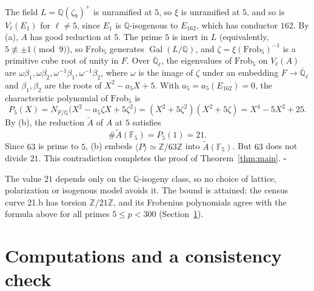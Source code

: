 \documentclass[11pt]{article}
\newcommand{\Q}{\mathbb Q}
\newcommand{\Z}{\mathbb Z}
\newcommand{\F}{\mathbb F}
\DeclareMathOperator{\Gal}{Gal}
\begin{document}
The field \(L=\Q(\zeta_9)^+\) is unramified at \(5\), so \(\xi\) is
unramified at \(5\), and so is \(V_\ell(E_1)\) for \(\ell\neq5\), since
\(E_1\) is \(\Q\)-isogenous to \(E_{162}\), which has conductor \(162\).
By (a), \(A\) has good reduction at \(5\). The prime \(5\) is inert in
\(L\) (equivalently, \(5\not\equiv\pm1\pmod9\)), so
\(\mathrm{Frob}_5\) generates \(\Gal(L/\Q)\), and
\(\zeta=\xi(\mathrm{Frob}_5)^{-1}\) is a primitive cube root of unity in
\(F\). Over \(\overline{\Q}_\ell\), the eigenvalues of
\(\mathrm{Frob}_5\) on \(V_\ell(A)\) are
\(\omega\beta_1,\omega\beta_2,\omega^{-1}\beta_1,\omega^{-1}\beta_2\),
where \(\omega\) is the image of \(\zeta\) under an embedding
\(F\to\overline{\Q}_\ell\) and \(\beta_1,\beta_2\) are the roots of
\(X^2-a_5X+5\). With \(a_5=a_5(E_{162})=0\), the characteristic
polynomial of \(\mathrm{Frob}_5\) is
\[
 P_5(X)=N_{F/\Q}\bigl(X^2-a_5\zeta X+5\zeta^2\bigr)
 =(X^2+5\zeta^2)(X^2+5\zeta)=X^4-5X^2+25 .
\]
By (b), the reduction \(\widetilde A\) of \(A\) at \(5\) satisfies
\[
 \#\widetilde A(\F_5)=P_5(1)=21 .
\]
Since \(63\) is prime to \(5\), (b) embeds
\(\langle P\rangle\simeq\Z/63\Z\) into \(\widetilde A(\F_5)\). But
\(63\) does not divide \(21\). This contradiction completes the proof of
Theorem~\ref{thm:main}.
\hfill\(\square\)

The value \(21\) depends only on the \(\Q\)-isogeny class, so no choice
of lattice, polarization or isogenous model avoids it. The bound is
attained: the census curve 21.b has torsion \(\Z/21\Z\), and its
Frobenius polynomials agree with the formula above for all primes
\(5\leq p<300\) (Section~\ref{sec:computations}).

\section{Computations and a consistency check}\label{sec:computations}
\end{document}

